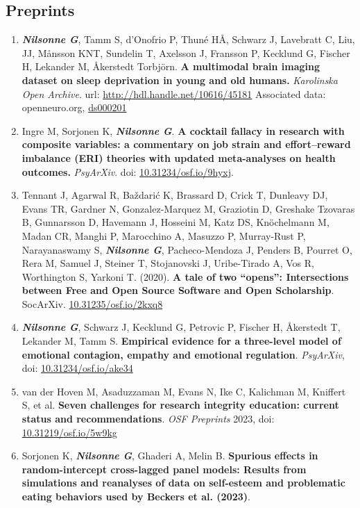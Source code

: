 \documentclass[10pt]{article}
\begin{document}
\subsection*{Preprints}
\begin{enumerate}[nolistsep]
\item \textbf{\textit{Nilsonne G}}, Tamm S, d’Onofrio P, Thuné HÅ, Schwarz J, Lavebratt C, Liu, JJ, Månsson KNT, Sundelin T, Axelsson J, Fransson P, Kecklund G, Fischer H, Lekander M, Åkerstedt Torbjörn. \textbf{A multimodal brain imaging dataset on sleep deprivation in young and old humans.} \emph{Karolinska Open Archive}.
url: \href{http://hdl.handle.net/10616/45181}{http://hdl.handle.net/10616/45181}
Associated data: openneuro.org, \href{https://openneuro.org/dataset/ds000201/}{ds000201}
\item Ingre M, Sorjonen K, \textbf{\textit{Nilsonne G}}. \textbf{A cocktail fallacy in research with composite variables: a commentary on job strain and effort–reward imbalance (ERI) theories with updated meta-analyses on health outcomes.} \emph{PsyArXiv}. doi: \href{http://doi.org/10.31234/osf.io/9hyxj}{10.31234/osf.io/9hyxj}.
\item Tennant J, Agarwal R, Baždarić K, Brassard D, Crick T, Dunleavy DJ, Evans TR, Gardner N, Gonzalez-Marquez M, Graziotin D, Greshake Tzovaras B, Gunnarsson D, Havemann J, Hosseini M, Katz DS, Knöchelmann M, Madan CR, Manghi P, Marocchino A, 
Masuzzo P, Murray-Rust P, Narayanaswamy S, \textbf{\textit{Nilsonne G}}, Pacheco-Mendoza J, Penders B, Pourret O, Rera M, Samuel J, Steiner T, Stojanovski J, Uribe-Tirado A, Vos R, Worthington S, Yarkoni T. (2020). \textbf{A tale of two “opens”: Intersections between Free and Open Source Software and Open Scholarship}. SocArXiv. \href{https://doi.org/10.31235/osf.io/2kxq8}{10.31235/osf.io/2kxq8}
\item \textbf{\textit{Nilsonne G}}, Schwarz J, Kecklund G, Petrovic P, Fischer H, Åkerstedt T, Lekander M, Tamm S. \textbf{Empirical evidence for a three-level model of emotional contagion, empathy and emotional regulation}. \emph{PsyArXiv}, doi: \href{https://doi.org/10.31234/osf.io/ake34}{10.31234/osf.io/ake34}
\item van der Hoven M, Asaduzzaman M, Evans N, Ike C, Kalichman M, Kniffert S, et al. \textbf{Seven challenges for research integrity education: current status and recommendations}. \emph{OSF Preprints} 2023, doi: \href{https://doi.org/10.31219/osf.io/5w9kg}{10.31219/osf.io/5w9kg}
\item Sorjonen K, \textbf{\textit{Nilsonne G}}, Ghaderi A, Melin B. \textbf{Spurious effects in random-intercept cross-lagged panel models: Results from simulations and reanalyses of data on self-esteem and problematic eating behaviors used by Beckers et al. (2023)}. 

\end{enumerate}
\end{document}

